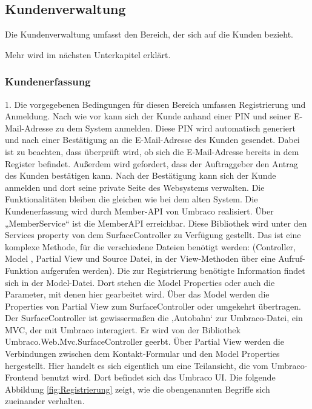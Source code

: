 \subsection{Kundenverwaltung}
Die Kundenverwaltung umfasst den Bereich, der sich auf die Kunden bezieht.

Mehr wird im nächsten Unterkapitel erklärt.

\subsubsection{Kundenerfassung}

1.	Die vorgegebenen Bedingungen für diesen Bereich umfassen Registrierung und Anmeldung. Nach wie vor kann sich der Kunde anhand einer \ac{PIN} und seiner E-Mail-Adresse zu dem System anmelden. Diese PIN wird automatisch generiert und nach einer Bestätigung an die E-Mail-Adresse des Kunden gesendet. Dabei ist zu beachten, dass überprüft wird, ob sich die E-Mail-Adresse bereits in dem Register befindet. Außerdem wird gefordert, dass der Auftraggeber den Antrag des Kunden bestätigen kann. Nach der Bestätigung kann sich der Kunde anmelden und dort seine private Seite des Websystems verwalten. Die Funktionalitäten bleiben die gleichen wie bei dem alten System. Die Kundenerfassung wird durch Member-\ac{API} von Umbraco realisiert. Über „MemberService“ ist die MemberAPI erreichbar. Diese Bibliothek wird unter den Services \cite{UmbracoHQ2018Services} property von dem SurfaceController \cite{UmbracoHQ2018Models} zu Verfügung gestellt. Das ist eine komplexe Methode, für die verschiedene Dateien benötigt werden: (Controller, Model \cite{UmbracoHQ2018Models}, Partial View und Source Datei, in der View-Methoden über eine Aufruf-Funktion aufgerufen werden). Die zur Registrierung benötigte Information findet sich in der Model-Datei. Dort stehen die Model Properties oder auch die Parameter, mit denen hier gearbeitet wird. Über das Model werden die Properties von Partial View zum SurfaceController oder umgekehrt übertragen. Der SurfaceController ist gewissermaßen die ‚Autobahn‘ zur Umbraco-Datei, ein \ac{MVC}, der mit Umbraco interagiert. Er wird von der Bibliothek Umbraco.Web.Mvc.SurfaceController geerbt. Über Partial View werden die Verbindungen zwischen dem Kontakt-Formular und den Model Properties hergestellt. Hier handelt es sich eigentlich um eine Teilansicht, die vom Umbraco-Frontend benutzt wird. Dort befindet sich das Umbraco \ac{UI}. Die folgende Abbildung \ref{fig:Registrierung} zeigt, wie die obengenannten Begriffe sich zueinander verhalten.

